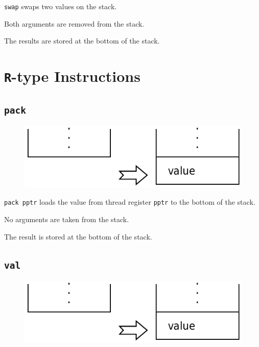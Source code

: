 			\texttt{swap} swaps two values on the stack.
			
			Both arguments are removed from the stack.
			
			The results are stored at the bottom of the stack.

\newpage
\section{\texttt{R}-type Instructions}

	\subsection*{\texttt{pack}}
	
		\begin{figure}
			\begin{flushright}
				\includegraphics[width=\linewidth]{figure/pdf/i_rtype} 
			\end{flushright}
		\end{figure}
	
			\texttt{pack pptr} loads the value from thread register 
			\texttt{pptr} to the bottom of the stack.
			
			No arguments are taken from the stack.
			
			The result is stored at the bottom of the stack.
	
	\qquad

	\subsection*{\texttt{val}}
	
		\begin{figure}
			\begin{flushright}
				\includegraphics[width=\linewidth]{figure/pdf/i_rtype} 
			\end{flushright}
		\end{figure}
	
